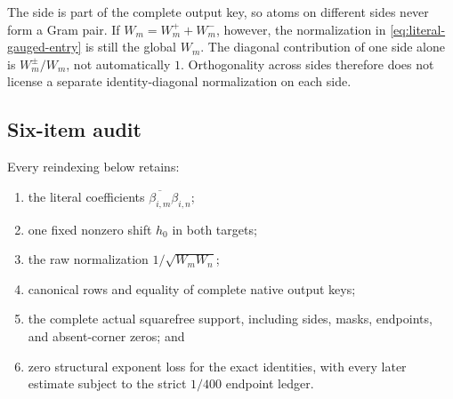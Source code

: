 \begin{remark}
\label{rem:sides-global-mass}
The side is part of the complete output key, so atoms on different sides
never form a Gram pair.  If
\(W_m=W_m^{+}+W_m^{-}\), however, the normalization in
\eqref{eq:literal-gauged-entry} is still the global \(W_m\).  The
diagonal contribution of one side alone is \(W_m^\pm/W_m\), not
automatically \(1\).  Orthogonality across sides therefore does not
license a separate identity-diagonal normalization on each side.
\end{remark}

\subsection{Six-item audit}

Every reindexing below retains:
\begin{enumerate}[label=\textup{(L1.\arabic*)},leftmargin=4em]
 \item the literal coefficients
       \(\overline{\beta_{i,m}}\beta_{i,n}\);
 \item one fixed nonzero shift \(h_0\) in both targets;
 \item the raw normalization \(1/\sqrt{W_mW_n}\);
 \item canonical rows and equality of complete native output keys;
 \item the complete actual squarefree support, including sides, masks,
       endpoints, and absent-corner zeros; and
 \item zero structural exponent loss for the exact identities, with every
       later estimate subject to the strict \(1/400\) endpoint ledger.
\end{enumerate}
